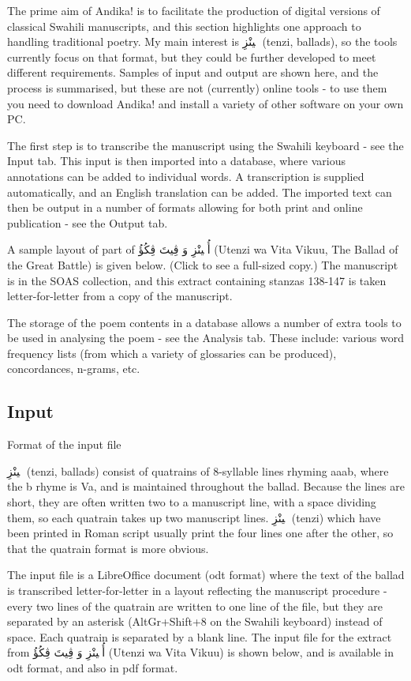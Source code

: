 \documentclass[a4paper,10pt]{article}
\begin{document}
The prime aim of Andika! is to facilitate the production of digital versions of classical Swahili manuscripts, and this section highlights one approach to handling traditional poetry. My main interest is تٖينْزِ (tenzi, ballads), so the tools currently focus on that format, but they could be further developed to meet different requirements. Samples of input and output are shown here, and the process is summarised, but these are not (currently) online tools - to use them you need to download Andika! and install a variety of other software on your own PC.

The first step is to transcribe the manuscript using the Swahili keyboard - see the Input tab. This input is then imported into a database, where various annotations can be added to individual words. A transcription is supplied automatically, and an English translation can be added. The imported text can then be output in a number of formats allowing for both print and online publication - see the Output tab.

A sample layout of part of أُتٖينْزِ وَ ڤِيتَ ڤِكُؤُ (Utenzi wa Vita Vikuu, The Ballad of the Great Battle) is given below. (Click to see a full-sized copy.) The manuscript is in the SOAS collection, and this extract containing stanzas 138-147 is taken letter-for-letter from a copy of the manuscript.

The storage of the poem contents in a database allows a number of extra tools to be used in analysing the poem - see the Analysis tab. These include: various word frequency lists (from which a variety of glossaries can be produced), concordances, n-grams, etc.


\subsection{Input}
Format of the input file

تٖينْزِ (tenzi, ballads) consist of quatrains of 8-syllable lines rhyming aaab, where the b rhyme is Va, and is maintained throughout the ballad. Because the lines are short, they are often written two to a manuscript line, with a space dividing them, so each quatrain takes up two manuscript lines. تٖينْزِ (tenzi) which have been printed in Roman script usually print the four lines one after the other, so that the quatrain format is more obvious.

The input file is a LibreOffice document (odt format) where the text of the ballad is transcribed letter-for-letter in a layout reflecting the manuscript procedure - every two lines of the quatrain are written to one line of the file, but they are separated by an asterisk (AltGr+Shift+8 on the Swahili keyboard) instead of space. Each quatrain is separated by a blank line. The input file for the extract from أُتٖينْزِ وَ ڤِيتَ ڤِكُؤُ (Utenzi wa Vita Vikuu) is shown below, and is available in odt format, and also in pdf format.
\end{document}
